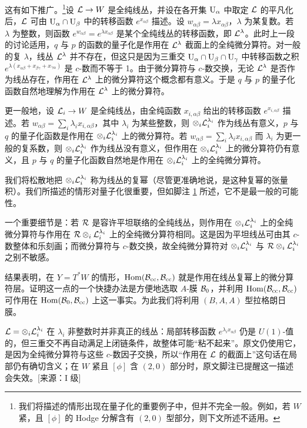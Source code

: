 这有如下推广。\footnote{\label{zany}我们将描述的情形出现在量子化的重要例子中，但并不完全一般。例如，若 $W$ 紧，且 $[\phi]$ 的 Hodge 分解含有 $(2,0)$ 型部分，则下文所述不适用。}设 ${\mathcal L}\to W$ 是全纯线丛，并设在各开集 ${\mathrm U}_\alpha$ 中取定 ${\mathcal L}$ 的平凡化后，${\mathcal L}$ 可由 ${\mathrm U}_\alpha\cap{\mathrm U}_\beta$ 中的转移函数 $e^{x_{\alpha\beta}}$ 描述。设 $w_{\alpha\beta}=\lambda x_{\alpha\beta}$，$\lambda$ 为某复数。若 $\lambda$ 为整数，则函数 $e^{w_{\alpha\beta}}=e^{\lambda x_{\alpha\beta}}$ 是某个全纯线丛的转移函数，即 ${\mathcal L}^\lambda$。此时上一段的讨论适用，$q$ 与 $p$ 的函数的量子化是作用在 ${\mathcal L}^\lambda$ 截面上的全纯微分算符。对一般的复 $\lambda$，线丛 ${\mathcal L}^\lambda$ 并不存在，但这只是因为三重交 ${\mathrm U}_\alpha\cap{\mathrm U}_\beta\cap{\mathrm U}_\gamma$ 中转移函数之积 $e^{\lambda(x_{\alpha\beta}+x_{\beta\gamma}+x_{\gamma\alpha})}$ 是 $c$-数而不等于 1。由于微分算符与 $c$-数交换，无论 ${\mathcal L}^\lambda$ 是否作为线丛存在，作用在 ${\mathcal L}^\lambda$ 上的微分算符这个概念都有意义。于是 $q$ 与 $p$ 的量子化函数自然地理解为作用在 ${\mathcal L}^\lambda$ 上的微分算符。

更一般地，设 ${\mathcal L}_i\to W$ 是全纯线丛，由全纯函数 $x_{i,\alpha\beta}$ 给出的转移函数 $e^{x_{i,\alpha\beta}}$ 描述。若 $w_{\alpha\beta}=\sum_i\lambda_ix_{i,\alpha\beta}$，其中 $\lambda_i$ 为某些整数，则 $\otimes_i{\mathcal L}_i^{\lambda_i}$ 作为线丛有意义，$p$ 与 $q$ 的量子化函数是作用在 $\otimes_i{\mathcal L}_i^{\lambda_i}$ 上的微分算符。若 $w_{\alpha\beta}=\sum_i\lambda_ix_{i,\alpha\beta}$ 而 $\lambda_i$ 为更一般的复系数，则 $\otimes_i{\mathcal L}_i^{\lambda_i}$ 作为线丛没有意义，但作用在 $\otimes_i{\mathcal L}_i^{\lambda_i}$ 上的微分算符仍有意义，且 $p$ 与 $q$ 的量子化函数自然地是作用在 $\otimes_i{\mathcal L}_i^{\lambda_i}$ 上的全纯微分算符。

我们将松散地把 $\otimes_i{\mathcal L}_i^{\lambda_i}$ 称为线丛的复幂（尽管更准确地说，是这种复幂的张量积）。我们所描述的情形对量子化很重要，但如脚注 \ref{zany} 所述，它不是最一般的可能性。

一个重要细节是：若 ${\mathcal R}$ 是容许平坦联络的全纯线丛，则作用在 $\otimes_i{\mathcal L}_i^{\lambda_i}$ 上的全纯微分算符与作用在 ${\mathcal R}\otimes_i{\mathcal L}_i^{\lambda_i}$ 上的全纯微分算符相同。这是因为平坦线丛可由其 $c$-数整体和乐刻画；而微分算符与 $c$-数交换，故全纯微分算符对 $\otimes_i{\mathcal L}_i^{\lambda_i}$ 与 ${\mathcal R}\otimes_i{\mathcal L}_i^{\lambda_i}$ 之别不敏感。

结果表明，在 $Y=T^*W$ 的情形，${\mathrm{Hom}}({\mathcal B}_{\mathrm{cc}},{\mathcal B}_{\mathrm{cc}})$ 就是作用在线丛复幂上的微分算符层。证明这一点的一个快捷办法是方便地选取 $A$-膜 ${\mathcal B}_0$，并利用 ${\mathrm{Hom}}({\mathcal B}_{\mathrm{cc}},{\mathcal B}_{\mathrm{cc}})$ 可作用在 ${\mathrm{Hom}}({\mathcal B}_0,{\mathcal B}_{\mathrm{cc}})$ 上这一事实。为此我们将利用 $(B,A,A)$ 型拉格朗日膜。

\begin{yizhu}
${\mathcal L}=\otimes_i{\mathcal L}_i^{\lambda_i}$ 在 $\lambda_i$ 非整数时并非真正的线丛：局部转移函数 $e^{\lambda_i x_{\alpha\beta}}$ 仍是 $U(1)$-值的，但三重交不再自动满足上闭链条件，故整体可能“粘不起来”。原文仍使用它，是因为全纯微分算符与这些 $c$-数因子交换，所以“作用在 ${\mathcal L}$ 的截面上”这句话在局部仍有确切含义；在 $W$ 紧且 $[\phi]$ 含 $(2,0)$ 部分时，原文脚注已提醒这一描述会失效。[来源：I 级]
\end{yizhu}
